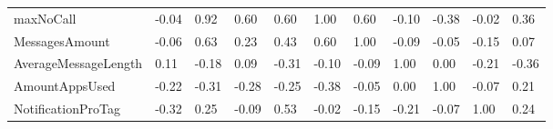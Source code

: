 \begin{table}[]
\begin{tabular}{@{}l|llllllllll@{}}
\multicolumn{1}{|l|}{maxNoCall}                                & \cellcolor[HTML]{4FD22F}-0.04                & 0.92                                                 & 0.60                                 & 0.60                                                & 1.00                           & 0.60                                & -0.10                                     & -0.38                               & -0.02                                   & 0.36                                                          \\ \cmidrule(r){1-1}
\multicolumn{1}{|l|}{MessagesAmount}                           & \cellcolor[HTML]{4FD22F}-0.06                & 0.63                                                 & 0.23                                 & 0.43                                                & 0.60                           & 1.00                                & -0.09                                     & -0.05                               & -0.15                                   & 0.07                                                          \\ \cmidrule(r){1-1}
\multicolumn{1}{|l|}{AverageMessageLength}                     & \cellcolor[HTML]{4FD22F}0.11                 & -0.18                                                & 0.09                                 & -0.31                                               & -0.10                          & -0.09                               & 1.00                                      & 0.00                                & -0.21                                   & -0.36                                                         \\ \cmidrule(r){1-1}
\multicolumn{1}{|l|}{AmountAppsUsed}                           & \cellcolor[HTML]{4FD22F}-0.22                & -0.31                                                & -0.28                                & -0.25                                               & -0.38                          & -0.05                               & 0.00                                      & 1.00                                & -0.07                                   & 0.21                                                          \\ \cmidrule(r){1-1}
\multicolumn{1}{|l|}{NotificationProTag}                       & \cellcolor[HTML]{4FD22F}-0.32                & 0.25                                                 & -0.09                                & 0.53                                                & -0.02                          & -0.15                               & -0.21                                     & -0.07                               & 1.00                                    & 0.24                                                          \\ \cmidrule(r){1-1}

\end{tabular}
\end{table}
